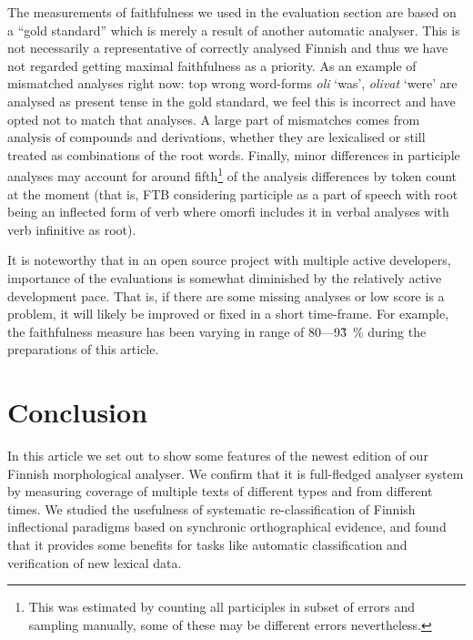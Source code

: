 \documentclass[a4paper,12pt]{article}
\newif\iffinal
\begin{document}
The measurements of faithfulness we used in the evaluation section are based on
a ``gold standard'' which is merely a result of another automatic analyser.
This is not necessarily a representative of correctly analysed Finnish and thus
we have not regarded getting maximal faithfulness as a priority. As an example
of mismatched analyses right now: top wrong word-forms \emph{oli} `was',
\emph{olivat} `were' are analysed as present tense in the gold standard, we
feel this is incorrect and have opted not to match that analyses. A large part
of mismatches comes from analysis of compounds and derivations, whether they
are lexicalised or still treated as combinations of the root words. Finally,
minor differences in participle analyses may account for around
fifth\footnote{This was estimated by counting all participles in subset of
errors and sampling manually, some of these may be different errors
nevertheless.} of the analysis differences by token count at the moment (that
is, FTB considering participle as a part of speech with root being an inflected
form of verb where omorfi includes it in verbal analyses with verb infinitive
as root).

It is noteworthy that in an open source project with multiple active
developers, importance of the evaluations is somewhat diminished by the
relatively active development pace. That is, if there are some missing analyses
or low score is a problem, it will likely be improved or fixed in a short
time-frame. For example, the faithfulness measure has been varying in range of
80---93̃~\% during the preparations of this article.

\section{Conclusion}
\label{sec:conclusion}

In this article we set out to show some features of the newest edition of our
Finnish morphological analyser. We confirm that it is full-fledged analyser
system by measuring coverage of multiple texts of different types and from
different times.  We studied the usefulness of systematic re-classification of
Finnish inflectional paradigms based on synchronic orthographical evidence, and
found that it provides some benefits for tasks like automatic classification
and verification of new lexical data.



\iffinal
\newpage
\begin{small}
    \noindent Contact Information:\\
\\
    Tommi A Pirinen\\
    Dublin City University\\
    Glasnevin\\
    Dublin 9\\
    Ireland\\
    e-mail: \url{Tommi.Pirinen@computing.dcu.ie}\\
\end{small}
\fi
\end{document}
